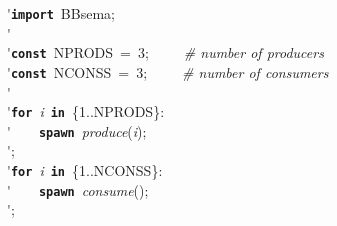 \'\>\texttt{\textbf{import}}~BBsema;\\

\'\>\\

\'\>\texttt{\textbf{const}}~NPRODS~=~3;~~~~~\emph{\# number of producers}\\

\'\>\texttt{\textbf{const}}~NCONSS~=~3;~~~~~\emph{\# number of consumers}\\

\'\>\\

\'\>\texttt{\textbf{for}}~\textit{i}~\texttt{\textbf{in}}~\{1..NPRODS\}:\\

\'\>~~~~\texttt{\textbf{spawn}}~\textit{produce}(\textit{i});\\

\'\>;\\

\'\>\texttt{\textbf{for}}~\textit{i}~\texttt{\textbf{in}}~\{1..NCONSS\}:\\

\'\>~~~~\texttt{\textbf{spawn}}~\textit{consume}();\\

\'\>;